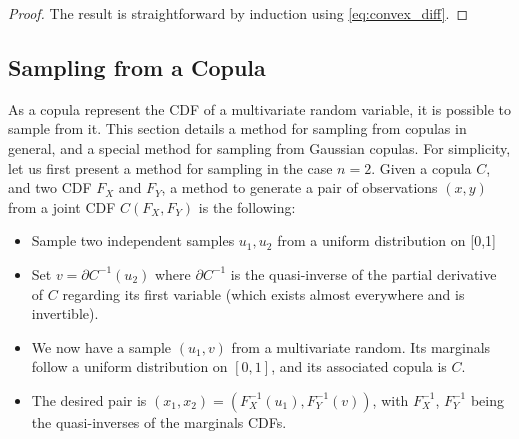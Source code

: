 \begin{proof}
    The result is straightforward by induction using \cref{eq:convex_diff}.
\end{proof}

\subsection{Sampling from a Copula}\label{sec:sampling_copula}
As a copula represent the CDF of a multivariate random variable, it is possible to sample from it. This section details a method for sampling from copulas in general, and a special method for sampling from Gaussian copulas.  For simplicity, let us first present a method for sampling in the case $n=2$. Given a copula $C$, and two CDF $F_X$ and $F_Y$, a method to generate a pair of observations $(x, y)$ from a joint CDF $C(F_X, F_Y)$ is the following:

\begin{itemize}
    \item Sample two independent samples $u_1, u_2$ from a uniform distribution on [0,1]
    \item Set $v=\partial C^{-1}(u_2)$ where $\partial C^{-1}$ is the quasi-inverse of the partial derivative of $C$ regarding its first variable (which exists almost everywhere and is invertible).
    \item We now have a sample $(u_1, v)$ from a multivariate random. Its marginals follow a uniform distribution on $[0,1]$, and its associated copula is $C$.
    \item The desired pair is $(x_1,x_2) = (F^{-1}_X(u_1), F^{-1}_Y(v))$, with $F_X^{-1}$, $F_Y^{-1}$ being the quasi-inverses of the marginals CDFs.
\end{itemize}

